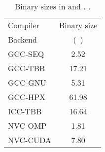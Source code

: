 \begin{table}[t]
	\centering
	\caption*{Binary sizes in \machhydralong and \machteslalong. \lowerisbetter.}
	\label{tab:binary-sizes}
	\scriptsize
	\begin{tabular}{lS[table-number-alignment=right, table-auto-round=true, table-format=1.1]}
		\toprule
		Compiler & {Binary size}         \\
		Backend  & {(\unit{\mebi\byte})} \\
		\midrule
		GCC-SEQ  & 2.52                  \\
		GCC-TBB  & 17.21                 \\
		GCC-GNU  & 5.31                  \\
		GCC-HPX  & 61.98                 \\
		ICC-TBB  & 16.64                 \\
		NVC-OMP  & 1.81                  \\
		NVC-CUDA & 7.80                  \\
		\bottomrule
	\end{tabular}
\end{table}